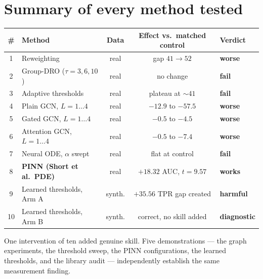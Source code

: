 \documentclass[11pt,a4paper]{article}
\newcommand{\verdictgood}[1]{\textcolor{dkgreen}{\textbf{#1}}}
\newcommand{\verdictbad}[1]{\textcolor{dkred}{\textbf{#1}}}
\begin{document}
\section{Summary of every method tested}

\begin{center}
\begin{tabular}{clccl}
\toprule
\# & Method & Data & Effect vs.\ matched control & Verdict \\
\midrule
1 & Reweighting & real & gap $41 \to 52$ & \verdictbad{worse} \\
2 & Group-DRO ($\tau = 3,6,10$) & real & no change & \verdictbad{fail} \\
3 & Adaptive thresholds & real & plateau at $\sim41$ & \verdictbad{fail} \\
4 & Plain GCN, $L = 1\ldots4$ & real & $-12.9$ to $-57.5$ & \verdictbad{worse} \\
5 & Gated GCN, $L = 1\ldots4$ & real & $-0.5$ to $-4.5$ & \verdictbad{worse} \\
6 & Attention GCN, $L = 1\ldots4$ & real & $-0.5$ to $-7.4$ & \verdictbad{worse} \\
7 & Neural ODE, $\alpha$ swept & real & flat at control & \verdictbad{fail} \\
8 & \textbf{PINN (Short et al.\ PDE)} & real & $\mathbf{+18.32}$ AUC, $t = 9.57$ & \verdictgood{works} \\
9 & Learned thresholds, Arm A & synth. & $+35.56$ TPR gap created & \verdictbad{harmful} \\
10 & Learned thresholds, Arm B & synth. & correct, no skill added & \verdictgood{diagnostic} \\
\bottomrule
\end{tabular}
\end{center}

\noindent One intervention of ten added genuine skill. Five demonstrations ---
the graph experiments, the threshold sweep, the PINN configurations, the learned
thresholds, and the library audit --- independently establish the same
measurement finding.

\end{document}
